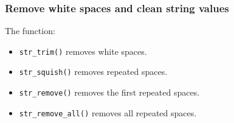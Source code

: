 \documentclass[
]{book}
\providecommand{\tightlist}{%
  \setlength{\itemsep}{0pt}\setlength{\parskip}{0pt}}
\begin{document}
\hypertarget{remove-white-spaces-and-clean-string-values-1}{%
\subsubsection{Remove white spaces and clean string values}\label{remove-white-spaces-and-clean-string-values-1}}

The function:

\begin{itemize}
\tightlist
\item
  \texttt{str\_trim()} removes white spaces.
\item
  \texttt{str\_squish()} removes repeated spaces.
\item
  \texttt{str\_remove()} removes the first repeated spaces.
\item
  \texttt{str\_remove\_all()} removes all repeated spaces.
\end{itemize}
\end{document}
